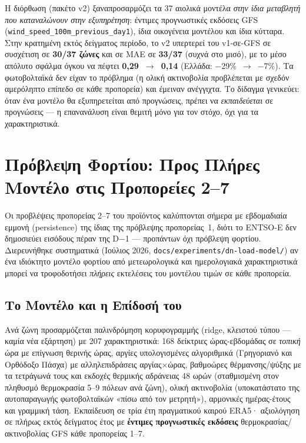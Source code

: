 Η διόρθωση (πακέτο v2) ξαναπροσαρμόζει τα 37 αιολικά μοντέλα \emph{στην ίδια μεταβλητή που καταναλώνουν στην εξυπηρέτηση}: έντιμες προγνωστικές εκδόσεις GFS (\texttt{wind\_speed\_100m\_previous\_day1}), ίδια οικογένεια μοντέλου και ίδια κύτταρα. Στην κρατημένη εκτός δείγματος περίοδο, το v2 υπερτερεί του v1-σε-GFS σε συσχέτιση σε \textbf{30/37 ζώνες} και σε MAE σε \textbf{33/37} (συχνά στο μισό), με το μέσο απόλυτο σφάλμα όγκου να πέφτει \textbf{0,29~$\to$~0,14} (Ελλάδα: $-$29\%~$\to$~$-$7\%). Τα φωτοβολταϊκά δεν είχαν το πρόβλημα (η ολική ακτινοβολία προβλέπεται με σχεδόν αμερόληπτο επίπεδο σε κάθε προπορεία) και έμειναν ανέγγιχτα. Το δίδαγμα γενικεύει: όταν ένα μοντέλο θα εξυπηρετείται από προγνώσεις, πρέπει να \emph{εκπαιδεύεται} σε προγνώσεις --- η επανανάλυση είναι θεμιτή μόνο για τον στόχο, όχι για τα χαρακτηριστικά.


\section{Πρόβλεψη Φορτίου: Προς Πλήρες Μοντέλο στις Προπορείες 2--7}
\label{sec:dn-load-model}

Οι προβλέψεις προπορείας 2--7 του προϊόντος καλύπτονται σήμερα με εβδομαδιαία εμμονή (persistence) της ίδιας της πρόβλεψης προπορείας~1, διότι το ENTSO-E δεν δημοσιεύει εισόδους πέραν της D$-$1 --- προπάντων όχι πρόβλεψη φορτίου. Διερευνήθηκε συστηματικά (Ιούλιος 2026, \texttt{docs/experiments/dn-load-model/}) αν ένα ιδιόκτητο μοντέλο φορτίου από μετεωρολογικά και ημερολογιακά χαρακτηριστικά μπορεί να τροφοδοτήσει \emph{πλήρεις} εκτελέσεις του μοντέλου τιμών σε κάθε προπορεία.

\subsection{Το Μοντέλο και η Επίδοσή του}
\label{subsec:load-model}

Ανά ζώνη προσαρμόζεται παλινδρόμηση κορυφογραμμής (ridge, κλειστού τύπου --- καμία νέα εξάρτηση) με 207 χαρακτηριστικά: 168 δείκτριες ώρας-εβδομάδας σε \emph{τοπική} ώρα με επίγνωση θερινής ώρας, αργίες υπολογισμένες αλγοριθμικά (Γρηγοριανό και Ορθόδοξο Πάσχα) με αλληλεπιδράσεις αργίας$\times$ώρας, βαθμοώρες θέρμανσης/ψύξης με τα τετράγωνά τους και εκδοχές θερμικής αδράνειας 48 ωρών (σταθμισμένη στον πληθυσμό θερμοκρασία 5--9 πόλεων ανά ζώνη), ολική ακτινοβολία (υποκατάστατο της αυτοπαραγωγής φωτοβολταϊκών «πίσω από τον μετρητή»), αρμονικές ημέρας-έτους και γραμμική τάση. Εκπαίδευση σε τρία έτη πραγματικού καιρού ERA5· αξιολόγηση σε πλήρως εκτός δείγματος έτος με \textbf{έντιμες προγνωστικές εκδόσεις} θερμοκρασίας/ακτινοβολίας GFS κάθε προπορείας 1--7.

